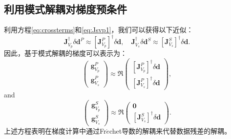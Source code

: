 \subsection{利用模式解耦对梯度预条件}
利用方程\eqref{eq:crossterms}和\eqref{eq:Jsvp1}，我们可以获得以下近似：
\begin{equation}
        \mathbf{J}^{\dagger}_{V_p}\delta \mathbf{d}^P\approx
        [\mathbf{J}^P_{V_p}]^{\dagger}\delta \mathbf{d},\quad
        \mathbf{J}^{\dagger}_{V_s}\delta \mathbf{d}^S\approx
        [\mathbf{J}^S_{V_s}]^{\dagger}\delta \mathbf{d}.
        \label{eq:crossterm}
\end{equation}
因此，基于模式解耦的梯度可以表示为：
\begin{equation}
        \begin{pmatrix}
                \mathbf{g}^P_{V_p}\\
                \mathbf{g}^P_{V_s}
        \end{pmatrix}
        \approx\mathfrak{R}\begin{pmatrix}
                [\mathbf{J}_{V_p}^{P}]^{\dagger}\delta \mathbf{d}\\
                [\mathbf{J}_{V_s}^{P}]^{\dagger}\delta \mathbf{d}
        \end{pmatrix},
        \label{eq:MatrixGraP}
\end{equation}
and
\begin{equation}
        \begin{pmatrix}
                \mathbf{g}^S_{V_p}\\ 
                \mathbf{g}^S_{V_s}
        \end{pmatrix}
        \approx\mathfrak{R}\begin{pmatrix}
                \mathbf{0}\\ 
                [\mathbf{J}^S_{V_s}]^{\dagger}\delta \mathbf{d}
        \end{pmatrix}.
        \label{eq:MatrixGraS}
\end{equation}
上述方程表明在梯度计算中通过Fr{$\acute{e}$}chet导数的解耦来代替数据残差的解耦。

